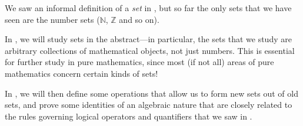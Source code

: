 We saw an informal definition of a \textit{set} in , but so far the only sets that we have seen are the number sets ($\mathbb{N}$, $\mathbb{Z}$ and so on).

In , we will study sets in the abstract---in particular, the sets that we study are arbitrary collections of mathematical objects, not just numbers. This is essential for further study in pure mathematics, since most (if not all) areas of pure mathematics concern certain kinds of sets!

In , we will then define some operations that allow us to form new sets out of old sets, and prove some identities of an algebraic nature that are closely related to the rules governing logical operators and quantifiers that we saw in .